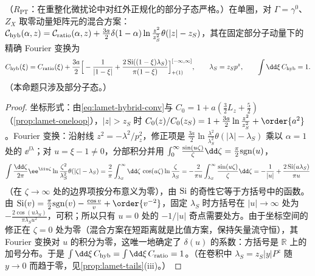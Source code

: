 \begin{proposition}\label{prop:lamet-hybrid-kernel}
（$R_{\mathrm{PT}}$：在重整化微扰论中对红外正规化的部分子态严格。）在单圈，对 $\Gamma=\gamma^0$、$Z_X$ 取零动量矩阵元的混合方案：$\mathcal C_{\rm hyb}(\alpha,z)=\mathcal C_{\rm ratio}(\alpha,z)+\frac{3a}2\delta(1-\alpha)\ln\frac{z^2}{z_S^2}\theta(|z|-z_S)$，其在固定部分子动量下的精确 Fourier 变换为
\begin{equation}\label{eq:lamet-hybrid-kernel}
C_{\rm hyb}(\xi)=C_{\rm ratio}(\xi)+\frac{3a}2\Big[-\frac1{|1-\xi|}+\frac{2\,{\rm Si}((1-\xi)\lambda_S)}{\pi(1-\xi)}\Big]^{[-\infty,\infty]}_{+(1)},\qquad\lambda_S=z_Sp^z,\qquad\int\dd\xi\,C_{\rm hyb}=1 .
\end{equation}%
（本命题只涉及部分子态。）
\end{proposition}

\begin{proof}
坐标形式：由\cref{eq:lamet-hybrid-conv}与 $C_0=1+a(\frac32L_z+\frac52)$（\cref{prop:lamet-oneloop}），$|z|>z_S$ 时 $C_0(z)/C_0(z_S)=1+\frac{3a}2\ln\frac{z^2}{z_S^2}+\order{a^2}$。Fourier 变换：沿射线 $z^2=-\lambda^2/p_z^2$，修正项是 $\frac{3a}2\ln\frac{\lambda^2}{\lambda_S^2}\theta(|\lambda|-\lambda_S)$ 乘以 $\alpha=1$ 处的 $\ee^{\ii\lambda}$；对 $u=\xi-1\neq0$，分部积分并用 $\int_0^\infty\frac{\sin(u\zeta)}\zeta\dd\zeta=\frac\pi2{\rm sgn}(u)$，
\[
\int\frac{\dd\zeta}{2\pi}\ee^{\ii u\zeta}\ln\frac{\zeta^2}{\lambda_S^2}\theta(|\zeta|-\lambda_S)=\frac2\pi\int_{\lambda_S}^\infty\dd\zeta\,\cos(u\zeta)\ln\frac\zeta{\lambda_S}=-\frac2{\pi u}\int_{\lambda_S}^\infty\frac{\sin(u\zeta)}\zeta\dd\zeta=-\frac1{|u|}+\frac{2\,{\rm Si}(u\lambda_S)}{\pi u}
\]
（在 $\zeta\to\infty$ 处的边界项按分布意义为零），由 ${\rm Si}$ 的奇性它等于方括号中的函数。由 ${\rm Si}(v)=\frac\pi2{\rm sgn}(v)-\frac{\cos v}v+\order{v^{-2}}$，固定 $\lambda_S$ 时方括号在 $|u|\to\infty$ 处为 $-\frac{2\cos(u\lambda_S)}{\pi\lambda_Su^2}$，可积；所以只有 $u=0$ 处的 $-1/|u|$ 奇点需要处方。由于坐标空间的修正在 $\zeta=0$ 处为零（混合方案在短距离就是比值方案，保持矢量流守恒），其 Fourier 变换对 $u$ 的积分为零，这唯一地确定了 $\delta(u)$ 的系数：方括号是 $\mathbb R$ 上的加号分布。于是 $\int\dd\xi\,C_{\rm hyb}=\int\dd\xi\,C_{\rm ratio}=1$。（在卷积中 $\lambda_S=z_S|y|P^z$ 随 $y\to0$ 而趋于零，见\cref{prop:lamet-tails}(iii)。）
\end{proof}

